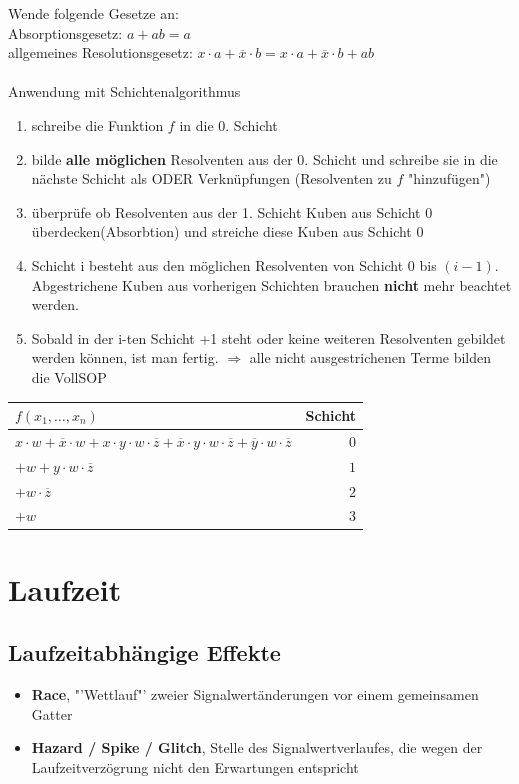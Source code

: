 \documentclass[6pt,a4paper]{scrartcl}
\renewcommand{\emph}[1]{\textsf{\textbf{#1}}}
\newcommand{\Ra}[0]{\ensuremath{\Rightarrow}}									%
\begin{document}
\begin{multicols}{3}
	Wende folgende Gesetze an: \\
	Absorptionsgesetz: $a + ab = a$ \\
	allgemeines Resolutionsgesetz: $x \cdot a + \overline x \cdot b = x \cdot a + \overline x \cdot b + ab$ \\
	\\
	Anwendung mit Schichtenalgorithmus
	\begin{enumerate}
		\item schreibe die Funktion $f$ in die 0. Schicht
		\item bilde \textbf{alle möglichen} Resolventen aus der 0. Schicht und schreibe sie in die nächste Schicht als ODER Verknüpfungen (Resolventen zu $f$ "hinzufügen")
		\item überprüfe ob Resolventen aus der 1. Schicht Kuben aus Schicht 0 überdecken(Absorbtion) und streiche diese Kuben aus Schicht 0
		\item Schicht i besteht aus den möglichen Resolventen von Schicht 0 bis $(i-1)$. Abgestrichene Kuben aus vorherigen Schichten brauchen \textbf{nicht} mehr beachtet werden.
		\item Sobald in der i-ten Schicht +1 steht oder keine weiteren Resolventen gebildet werden können, ist man fertig. 
		$\Ra $ alle nicht ausgestrichenen Terme bilden die VollSOP
	\end{enumerate}
	
	\begin{tabular}{l | r}
	$f(x_1, \ldots, x_n)$ & Schicht \\ \midrule
	$x \cdot w + \overline x \cdot w + x \cdot y \cdot w \cdot \overline z + \overline x \cdot y \cdot w \cdot \overline z + \overline y \cdot w \cdot \overline z $& $0$ \\
	$+ w + y \cdot w \cdot \overline z$ & $1$ \\
	$+ w \cdot \overline z $ & $2$ \\
	$+ w$ &$ 3$
	\end{tabular}

\section{Laufzeit}

	\subsection{Laufzeitabhängige Effekte}
	\begin{itemize}
		\item \emph{Race}, "'Wettlauf"' zweier Signalwertänderungen vor einem gemeinsamen Gatter\\
		\item \emph{Hazard / Spike / Glitch}, Stelle des Signalwertverlaufes, die wegen der Laufzeitverzögrung nicht den Erwartungen entspricht\\
	\end{itemize}


\end{multicols}
\end{document}
